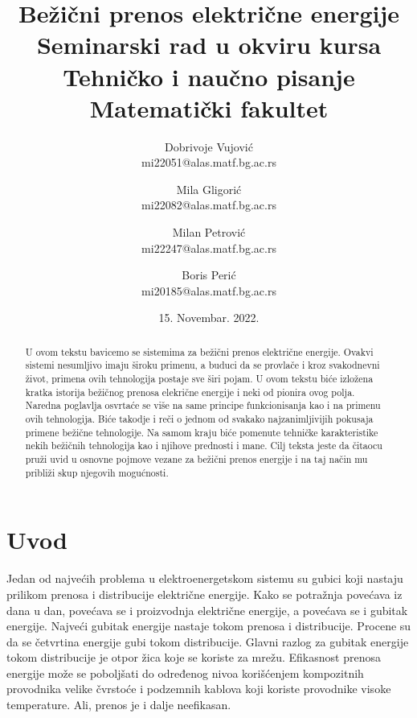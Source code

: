 \documentclass[a4paper]{article}
\begin{document}
	\title{Bežični prenos električne energije\\ \small{Seminarski rad u okviru kursa\\Tehničko i naučno pisanje\\ Matematički fakultet}}
	
	\author{Dobrivoje Vujović \\mi22051@alas.matf.bg.ac.rs 
			\and Mila Gligorić \\mi22082@alas.matf.bg.ac.rs
			\and Milan Petrović \\mi22247@alas.matf.bg.ac.rs
			\and Boris Perić\\mi20185@alas.matf.bg.ac.rs}

	\date{15. Novembar. 2022.}
	\maketitle
\begin{abstract}
    U ovom tekstu bavicemo se sistemima za bežični prenos električne energije. Ovakvi sistemi nesumljivo imaju široku primenu, a buduci da se provlače i kroz svakodnevni život, primena ovih tehnologija postaje sve širi pojam. U ovom tekstu biće izložena kratka istorija bežičnog prenosa elekrične energije i neki od pionira ovog polja. Naredna poglavlja osvrtaće se više na same principe funkcionisanja kao i na primenu ovih tehnologija. Biće takodje i reči o jednom od svakako najzanimljivijih pokusaja primene bežične tehnologije. Na samom kraju biće pomenute tehničke karakteristike nekih bežičnih tehnologija kao i njihove prednosti i mane. Cilj teksta jeste da čitaocu pruži uvid u osnovne pojmove vezane za bežični prenos energije i na taj način mu približi skup njegovih mogućnosti.
\end{abstract}
\tableofcontents
\newpage

\section{Uvod}

Jedan od najvećih problema u elektroenergetskom sistemu su gubici koji nastaju prilikom prenosa i distribucije električne energije. Kako se potražnja povećava iz dana u dan, povećava se i proizvodnja električne energije, a povećava se i gubitak energije. Najveći gubitak energije nastaje tokom prenosa i distribucije. Procene su da se četvrtina energije gubi tokom distribucije. Glavni razlog za gubitak energije tokom distribucije je otpor žica koje se koriste za mrežu. Efikasnost prenosa energije može se poboljšati do određenog nivoa korišćenjem kompozitnih provodnika velike čvrstoće i podzemnih kablova koji koriste provodnike visoke temperature. Ali, prenos je i dalje neefikasan.
\end{document}
